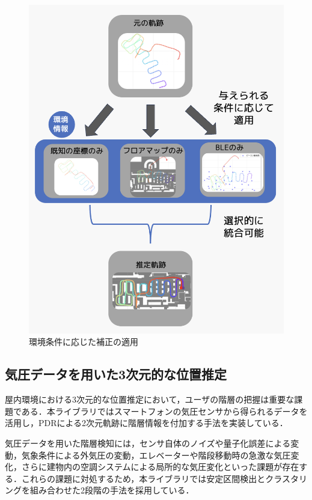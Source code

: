\documentclass[a4paper, 10pt, twocolumn]{jarticle}
\begin{document}
\begin{figure}[h]
    \centering
    \includegraphics[width=\linewidth]{image/integrate4.jpg}
    \caption{環境条件に応じた補正の適用}
    \label{fig:corrector-class}
\end{figure}


\subsection{気圧データを用いた3次元的な位置推定}

屋内環境における3次元的な位置推定において，ユーザの階層の把握は重要な課題である．本ライブラリではスマートフォンの気圧センサから得られるデータを活用し，PDRによる2次元軌跡に階層情報を付加する手法を実装している．

気圧データを用いた階層検知には，センサ自体のノイズや量子化誤差による変動，気象条件による外気圧の変動，エレベーターや階段移動時の急激な気圧変化，さらに建物内の空調システムによる局所的な気圧変化といった課題が存在する．これらの課題に対処するため，本ライブラリでは安定区間検出とクラスタリングを組み合わせた2段階の手法を採用している．
\end{document}
